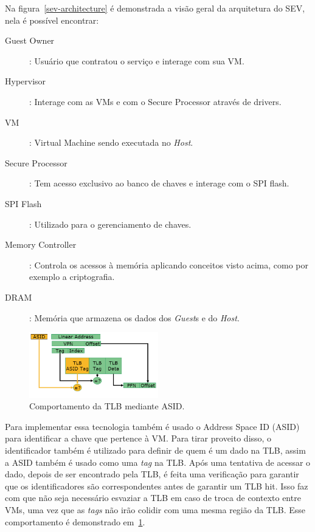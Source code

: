 \documentclass{report}
\begin{document}
Na figura~\ref{sev-architecture} é demonstrada a visão geral da arquitetura do
SEV, nela é possível encontrar:

\begin{description}
    \item[Guest Owner]: Usuário que contratou o serviço e interage com sua VM\@.
    \item[Hypervisor]: Interage com as VMs e com o Secure Processor através de
    drivers.
    \item[VM]: Virtual Machine sendo executada no \textit{Host}.
    \item[Secure Processor]: Tem acesso exclusivo ao banco de chaves e interage
    com o SPI flash.
    \item[SPI Flash]: Utilizado para o gerenciamento de chaves.
    \item[Memory Controller]: Controla os acessos à memória aplicando
    conceitos visto acima, como por exemplo a criptografia.
    \item[DRAM]: Memória que armazena os dados dos \textit{Guest}s e do \textit{Host}.
\end{description}

\begin{figure}[h]
    \centering
    \includegraphics[width=0.5\textwidth]{img/asid}
    \caption{Comportamento da TLB mediante ASID\@.}\label{asid}
\end{figure}

Para implementar essa tecnologia também é usado o Address Space ID (ASID) para
identificar a chave que pertence à VM\@. Para tirar proveito disso, o
identificador também é utilizado para definir de quem é um dado na TLB, assim a
ASID também é usado como uma \textit{tag} na TLB\@. Após uma tentativa de
acessar o dado, depois de ser encontrado pela TLB, é feita uma verificação para
garantir que os identificadores são correspondentes antes de garantir um TLB
hit. Isso faz com que não seja necessário esvaziar a TLB em caso de troca de
contexto entre VMs, uma vez que as \textit{tags} não irão colidir com uma mesma
região da TLB\@. Esse comportamento é demonstrado em~\ref{asid}.
\end{document}
